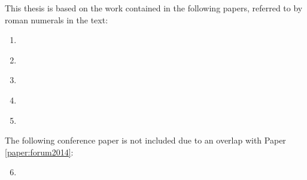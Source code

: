 \begin{refsection}

This thesis is based on the work contained in the following papers,
referred to by roman numerals in the text:
\begin{enumerate}[I]
 \item \label{paper:turbulence}  %
 \item \label{paper:overview}  %
 \item \label{paper:internoise2016}  %
 \item \label{paper:euronoise2015}  %
 \item \label{paper:forum2014}  %
\end{enumerate}
The following conference paper is not included due to an overlap with Paper \ref{paper:forum2014}:
\begin{enumerate}[I]
 \setcounter{enumi}{5}
 \item \label{paper:asa2014}  %
\end{enumerate}

\end{refsection}
